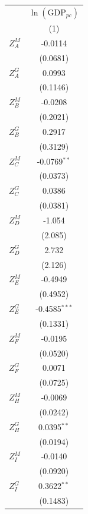 \begingroup
\centering
\begin{tabular}{lc}
   \toprule
                   & $\ln(\text{GDP}_{pc})$\\    
                   & (1)\\  
   \midrule 
   $Z^{M}_A$       & -0.0114\\   
                   & (0.0681)\\   
   $Z^{G}_A$       & 0.0993\\   
                   & (0.1146)\\   
   $Z^{M}_B$       & -0.0208\\   
                   & (0.2021)\\   
   $Z^{G}_B$       & 0.2917\\   
                   & (0.3129)\\   
   $Z^{M}_C$       & -0.0769$^{**}$\\   
                   & (0.0373)\\   
   $Z^{G}_C$       & 0.0386\\   
                   & (0.0381)\\   
   $Z^{M}_D$       & -1.054\\   
                   & (2.085)\\   
   $Z^{G}_D$       & 2.732\\   
                   & (2.126)\\   
   $Z^{M}_E$       & -0.4949\\   
                   & (0.4952)\\   
   $Z^{G}_E$       & -0.4585$^{***}$\\   
                   & (0.1331)\\   
   $Z^{M}_F$       & -0.0195\\   
                   & (0.0520)\\   
   $Z^{G}_F$       & 0.0071\\   
                   & (0.0725)\\   
   $Z^{M}_H$       & -0.0069\\   
                   & (0.0242)\\   
   $Z^{G}_H$       & 0.0395$^{**}$\\   
                   & (0.0194)\\   
   $Z^{M}_I$       & -0.0140\\   
                   & (0.0920)\\   
   $Z^{G}_I$       & 0.3622$^{**}$\\   
                   & (0.1483)\\   

\end{tabular}
